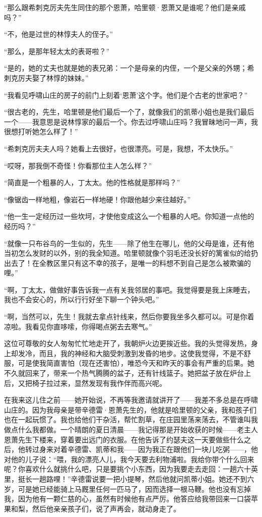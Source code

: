 \par “那么跟希刺克厉夫先生同住的那个恩萧，哈里顿·恩萧又是谁呢？他们是亲戚吗？”
\par “不，他是过世的林惇夫人的侄子。”
\par “那么，是那年轻太太的表哥啦？”
\par “是的，她的丈夫也就是她的表兄弟：一个是母亲的内侄，一个是父亲的外甥；希刺克厉夫娶了林惇的妹妹。”
\par “我看见呼啸山庄的房子的前门上刻着‘恩萧’这个字。他们是个古老的世家吧？”
\par “很古老的，先生，哈里顿是他们最后一个了，就像我们的凯蒂小姐也是我们最后一个——我意思是说林惇家的最后一个。你去过呼啸山庄吗？我冒昧地问一声，我很想打听她怎么样了！”
\par “希刺克厉夫夫人吗？她看上去很好，也很漂亮。可是，我想，不太快乐。”
\par “哎呀，那我倒不奇怪！你看那位主人怎么样？”
\par “简直是一个粗暴的人，丁太太。他的性格就是那样吗？”
\par “像锯齿一样地粗，像岩石一样地硬！你跟他越少来往越好。”
\par “他一生一定经历过一些坎坷，才使他变成这么一个粗暴的人吧。你知道一点他的经历吗？”
\par “就像一只布谷鸟的一生似的，先生——除了他生在哪儿，他的父母是谁，还有他当初怎么发财的以外，别的我全知道。哈里顿就像个羽毛还没长好的篱雀似的给扔出去了！在全教区里只有这不幸的孩子，是唯一的料想不到自己是怎么被欺骗的哩。”
\par “啊，丁太太，做做好事告诉我一点有关我邻居的事吧。我觉得要是我上床睡去，我也不会安心的，所以行行好坐下聊一个钟头吧。”
\par “啊，当然可以，先生！我就去拿点针线来，然后你要我坐多久都可以。可是你着凉啦。我看见你直哆嗦，你得喝点粥去去寒气。”
\par 这位可尊敬的女人匆匆忙忙地走开了，我朝炉火边更挨近些。我的头觉得发热，身上却发冷，而且，我的神经和大脑受刺激到发昏的地步。这使我觉得，不是不舒服，可是使我简直害怕（现在还害怕），唯恐今天和昨天的事会有严重的后果。她不久就回来了，带来一个热气腾腾的盆子，还有针线篮子。她把盆子放在炉台上后，又把椅子拉过来，显然发现有我作伴而高兴呢。
\par 在我来这儿住之前——她开始说，不再等我邀请就讲开了——我差不多总是在呼啸山庄的。因为我母亲是带辛德雷·恩萧先生的，他就是哈里顿的父亲，我和孩子们也在一起玩惯了。我也给他们干杂活，帮忙割草，在庄园里荡来荡去，不管谁叫我做点什么我都做。一个晴朗的夏日清晨——我记得那是开始收获的时候——老主人恩萧先生下楼来，穿着要出远门的衣服。在他告诉了约瑟夫这一天要做些什么之后，他转过身来对着辛德雷、凯蒂和我——因为我正在跟他们一块儿吃粥——，他对他的儿子说：“喂，我的漂亮人儿，我今天要去利物浦啦。我给你带个什么回来呢？你喜欢什么就挑什么吧，只是要挑个小东西，因为我要走去走回：一趟六十英里，挺长一趟路哩！”辛德雷说要一把小提琴，然后他就问凯蒂小姐。她还不到六岁，可是她已经能骑上马厩里任何一匹马了，因而选择一根马鞭。他也没有忘掉我，因为他有一颗仁慈的心，虽然有时候他有点严厉。他答应给我带回来一口袋苹果和梨，然后他亲亲孩子们，说了声再会，就动身走了。
